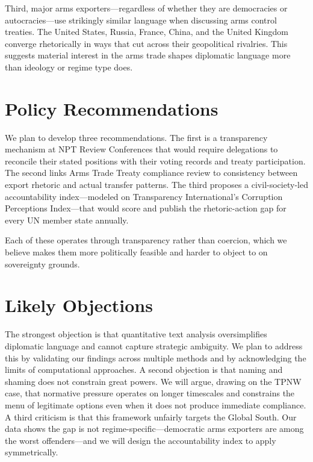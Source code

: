 \documentclass[12pt]{article}
\begin{document}
Third, major arms exporters---regardless of whether they are democracies or autocracies---use strikingly similar language when discussing arms control treaties. The United States, Russia, France, China, and the United Kingdom converge rhetorically in ways that cut across their geopolitical rivalries. This suggests material interest in the arms trade shapes diplomatic language more than ideology or regime type does.

\section*{Policy Recommendations}

We plan to develop three recommendations. The first is a transparency mechanism at NPT Review Conferences that would require delegations to reconcile their stated positions with their voting records and treaty participation. The second links Arms Trade Treaty compliance review to consistency between export rhetoric and actual transfer patterns. The third proposes a civil-society-led accountability index---modeled on Transparency International's Corruption Perceptions Index---that would score and publish the rhetoric-action gap for every UN member state annually.

Each of these operates through transparency rather than coercion, which we believe makes them more politically feasible and harder to object to on sovereignty grounds.

\section*{Likely Objections}

The strongest objection is that quantitative text analysis oversimplifies diplomatic language and cannot capture strategic ambiguity. We plan to address this by validating our findings across multiple methods and by acknowledging the limits of computational approaches. A second objection is that naming and shaming does not constrain great powers. We will argue, drawing on the TPNW case, that normative pressure operates on longer timescales and constrains the menu of legitimate options even when it does not produce immediate compliance. A third criticism is that this framework unfairly targets the Global South. Our data shows the gap is not regime-specific---democratic arms exporters are among the worst offenders---and we will design the accountability index to apply symmetrically.
\end{document}
